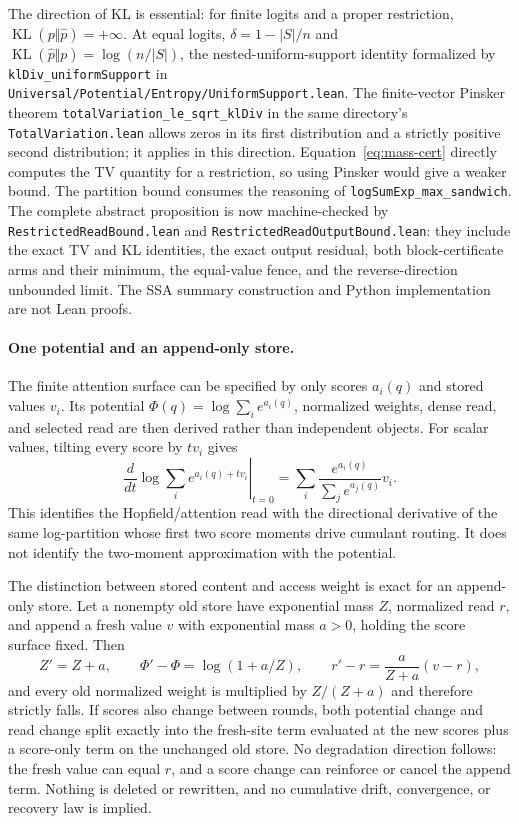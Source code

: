 \documentclass[11pt]{article}
\numberwithin{equation}{section}
\begin{document}
The direction of KL is essential: for finite logits and a proper restriction,
$\operatorname{KL}(p\Vert\widehat p)=+\infty$. At equal logits,
$\delta=1-|S|/n$ and $\operatorname{KL}(\widehat p\Vert p)=\log(n/|S|)$, the nested-uniform-support
identity formalized by \texttt{klDiv\_uniformSupport} in
\texttt{Universal/Potential/Entropy/UniformSupport.lean}. The finite-vector Pinsker theorem
\texttt{totalVariation\_le\_sqrt\_klDiv} in the same directory's \texttt{TotalVariation.lean}
allows zeros in its first distribution and a strictly positive second distribution; it applies in
this direction. Equation~\eqref{eq:mass-cert} directly computes the TV quantity for a restriction,
so using Pinsker would give a weaker bound. The partition bound consumes the reasoning of
\texttt{logSumExp\_max\_sandwich}. The complete abstract proposition is now machine-checked by
\texttt{RestrictedReadBound.lean} and \texttt{RestrictedReadOutputBound.lean}: they include the exact TV and
KL identities, the exact output residual, both block-certificate arms and their minimum, the equal-value
fence, and the reverse-direction unbounded limit. The SSA summary construction and Python implementation are
not Lean proofs.

\paragraph{One potential and an append-only store.} The finite attention surface can be specified by only
scores $a_i(q)$ and stored values $v_i$. Its potential
$\Phi(q)=\log\sum_i e^{a_i(q)}$, normalized weights, dense read, and selected read are then derived rather
than independent objects. For scalar values, tilting every score by $t v_i$ gives
\begin{equation}\label{eq:potential-read}
\left.\frac{d}{dt}\log\sum_i e^{a_i(q)+t v_i}\right|_{t=0}
=\sum_i\frac{e^{a_i(q)}}{\sum_j e^{a_j(q)}}v_i.
\end{equation}
This identifies the Hopfield/attention read with the directional derivative of the same log-partition whose
first two score moments drive cumulant routing. It does not identify the two-moment approximation with the
potential.

The distinction between stored content and access weight is exact for an append-only store. Let a nonempty
old store have exponential mass $Z$, normalized read $r$, and append a fresh value $v$ with exponential mass
$a>0$, holding the score surface fixed. Then
\begin{equation}\label{eq:append-read}
Z'=Z+a,\qquad \Phi'-\Phi=\log(1+a/Z),\qquad
r'-r=\frac{a}{Z+a}(v-r),
\end{equation}
and every old normalized weight is multiplied by $Z/(Z+a)$ and therefore strictly falls. If scores also
change between rounds, both potential change and read change split exactly into the fresh-site term evaluated
at the new scores plus a score-only term on the unchanged old store. No degradation direction follows: the
fresh value can equal $r$, and a score change can reinforce or cancel the append term. Nothing is deleted or
rewritten, and no cumulative drift, convergence, or recovery law is implied.
\end{document}
